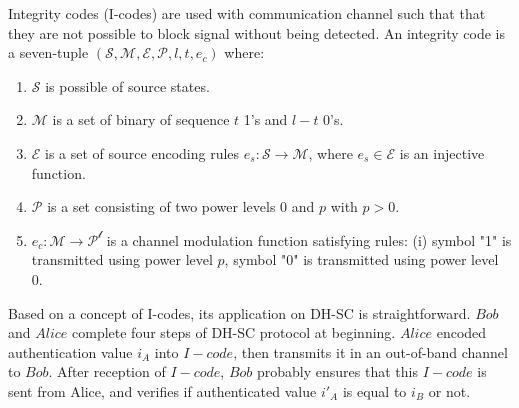 Integrity codes (I-codes) are used with communication channel such that that they are not possible to block signal without being detected. An integrity code is a seven-tuple $(\mathcal{S},\mathcal{M},\mathcal{E},\mathcal{P},l,t,e_c)$ where:
\begin{enumerate}
\item $\mathcal{S}$ is possible of source states. 
\item $\mathcal{M}$ is a set of binary of sequence $t$ 1's and $l-t$ 0's. 
\item $\mathcal{E}$ is a set of source encoding rules $e_s: \mathcal{S} \rightarrow \mathcal{M}$, where $e_s \in \mathcal{E}$ is an injective function. 
\item $\mathcal{P}$ is a set consisting of two power levels 0 and $p$ with $p > 0$.
\item $e_c:\mathcal{M} \rightarrow \mathcal{P^l}$ is a channel modulation function satisfying rules: (i) symbol "1" is transmitted using power level $p$, symbol "0" is transmitted using power level 0. 
\end{enumerate} 

Based on a concept of I-codes, its application on DH-SC is straightforward. $Bob$ and $Alice$ complete four steps of DH-SC protocol at beginning. $Alice$ encoded authentication value $i_A$ into $I-code$, then transmits it in an out-of-band channel to $Bob$. After reception of $I-code$, $Bob$ probably ensures that this $I-code$ is sent from Alice, and verifies if authenticated value $i'_A$ is equal to $i_B$ or not. 
 
